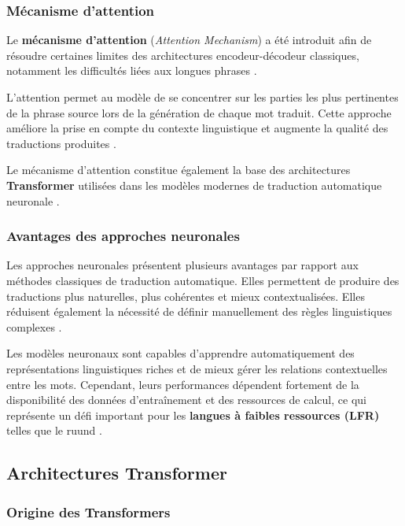 \subsubsection{Mécanisme d'attention}

Le \textbf{mécanisme d'attention} (\textit{Attention Mechanism}) a été introduit afin de résoudre certaines limites des architectures encodeur-décodeur classiques, notamment les difficultés liées aux longues phrases \cite{vaswani2017attention}.

L'attention permet au modèle de se concentrer sur les parties les plus pertinentes de la phrase source lors de la génération de chaque mot traduit. Cette approche améliore la prise en compte du contexte linguistique et augmente la qualité des traductions produites \cite{gangar2021hindi}.

Le mécanisme d'attention constitue également la base des architectures \textbf{Transformer} utilisées dans les modèles modernes de traduction automatique neuronale \cite{vaswani2017attention}.

\subsubsection{Avantages des approches neuronales}

Les approches neuronales présentent plusieurs avantages par rapport aux méthodes classiques de traduction automatique. Elles permettent de produire des traductions plus naturelles, plus cohérentes et mieux contextualisées. Elles réduisent également la nécessité de définir manuellement des règles linguistiques complexes \cite{ranathunga2023neural}.

Les modèles neuronaux sont capables d'apprendre automatiquement des représentations linguistiques riches et de mieux gérer les relations contextuelles entre les mots. Cependant, leurs performances dépendent fortement de la disponibilité des données d'entraînement et des ressources de calcul, ce qui représente un défi important pour les \textbf{langues à faibles ressources (\ac{LFR})} telles que le ruund \cite{haulai2023construction}.

\subsection{Architectures Transformer}

\subsubsection{Origine des Transformers}


